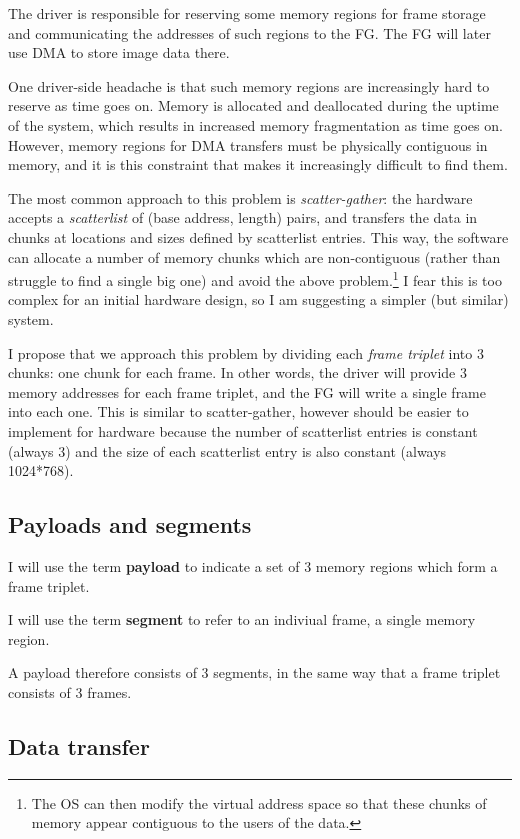 \documentclass[12pt]{article}
\begin{document}
The driver is responsible for reserving some memory regions for frame storage and communicating the addresses of such regions to the FG. The FG will later use DMA to store image data there.

One driver-side headache is that such memory regions are increasingly hard to reserve as time goes on. Memory is allocated and deallocated during the uptime of the system, which results in increased memory fragmentation as time goes on. However, memory regions for DMA transfers must be physically contiguous in memory, and it is this constraint that makes it increasingly difficult to find them.

The most common approach to this problem is \textit{scatter-gather}: the hardware accepts a \textit{scatterlist} of (base address, length) pairs, and transfers the data in chunks at locations and sizes defined by scatterlist entries. This way, the software can allocate a number of memory chunks which are non-contiguous (rather than struggle to find a single big one) and avoid the above problem.\footnote{The OS can then modify the virtual address space so that these chunks of memory appear contiguous to the users of the data.} I fear this is too complex for an initial hardware design, so I am suggesting a simpler (but similar) system.

I propose that we approach this problem by dividing each \textit{frame triplet} into 3 chunks: one chunk for each frame. In other words, the driver will provide 3 memory addresses for each frame triplet, and the FG will write a single frame into each one. This is similar to scatter-gather, however should be easier to implement for hardware because the number of scatterlist entries is constant (always 3) and the size of each scatterlist entry is also constant (always 1024*768).

\subsection{Payloads and segments}

I will use the term \textbf{payload} to indicate a set of 3 memory regions which form a frame triplet.

I will use the term \textbf{segment} to refer to an indiviual frame, a single memory region.

A payload therefore consists of 3 segments, in the same way that a frame triplet consists of 3 frames.

\subsection{Data transfer}
\end{document}
